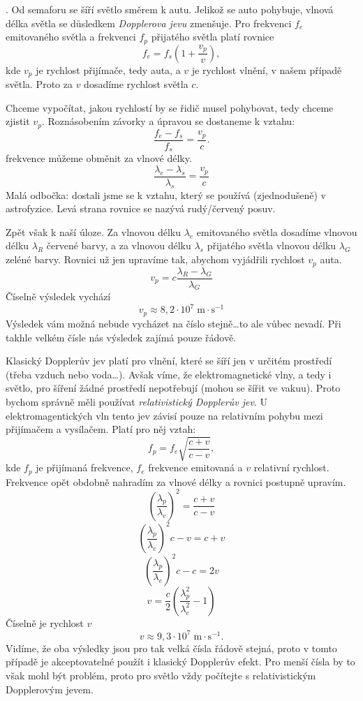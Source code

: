 \documentclass{../../../../style/mkimain}
\begin{document}
\noindent{}
.
\klein
Od semaforu se šíří světlo směrem k autu. Jelikož se auto pohybuje, vlnová délka světla se důsledkem \emph{Dopplerova jevu} zmenšuje.
Pro frekvenci $f_e$ emitovaného světla a frekvenci $f_p$ přijatého světla platí rovnice
$$f_e=f_s\left(1+\frac{v_p}{v}\right),$$
kde $v_p$ je rychlost přijímače, tedy auta, a $v$ je rychlost vlnění, v našem případě světla.
Proto za $v$ dosadíme rychlost světla $c$.

Chceme vypočítat, jakou rychlostí by se řidič musel pohybovat, tedy chceme zjistit $v_p$.
Roznásobením závorky a úpravou se dostaneme k vztahu:
$$\frac{f_e-f_s}{f_s}=\frac{v_p}{c}.$$
frekvence můžeme obměnit za vlnové délky. 
$$\frac{\lambda_e-\lambda_s}{\lambda_s}=\frac{v_p}{c}$$
Malá odbočka: dostali jsme se k vztahu, který se používá (zjednodušeně) v astrofyzice. Levá strana rovnice se nazývá rudý/červený posuv. 

Zpět však k naší úloze.
Za vlnovou délku $\lambda_e$ emitovaného světla dosadíme vlnovou délku $\lambda_R$ červené barvy, a za vlnovou délku $\lambda_s$ přijatého světla vlnovou délku $\lambda_G$ zeléné barvy. 
Rovnici už jen upravíme tak, abychom vyjádřili rychlost $v_p$ auta.
$${v_p}=c\frac{\lambda_R-\lambda_G}{\lambda_G}$$
Číselně výsledek vychází
$$v_p\approx8,2\cdot10^7\;\mathrm{m\cdot s^{-1}}$$
Výsledek vám možná nebude vycházet na číslo stejně\dots to ale vůbec nevadí. Při takhle velkém čísle nás výsledek zajímá pouze řádově.  

Klasický Dopplerův jev platí pro vlnění, které se šíří jen v určitém prostředí (třeba vzduch nebo voda\dots).
Avšak víme, že elektromagnetické vlny, a tedy i světlo, pro šíření žádné prostředí nepotřebují (mohou se šířit ve vakuu).
Proto bychom správně měli používat \textit{relativistický Dopplerův jev}.
U elektromagentických vln tento jev závisí pouze na relativním pohybu mezi přijímačem a vysílačem.
\newpage
\noindent
Platí pro něj vztah:
$$f_p=f_e\sqrt{\frac{c+v}{c-v}},$$
kde $f_p$ je přijímaná frekvence, $f_e$ frekvence emitovaná a $v$ relativní rychlost.
Frekvence opět obdobně nahradím za vlnové délky a rovnici postupně upravím.
$$\left(\frac{\lambda_p}{\lambda_e}\right)^2=\frac{c+v}{c-v}$$
$$\left(\frac{\lambda_p}{\lambda_e}\right)^2{c-v}={c+v}$$
$$\left(\frac{\lambda_p}{\lambda_e}\right)^2c-c=2v$$
$$v=\frac{c}{2}\left(\frac{\lambda_p^2}{\lambda_e^2}-1\right)$$
Číselně je rychlost $v$
$$v\approx9,3\cdot10^7\;\mathrm{m\cdot s^{-1}}.$$
Vidíme, že oba výsledky jsou pro tak velká čísla řádově stejná, proto v tomto případě je akceptovatelné použít i klasický Dopplerův efekt.
Pro menší čísla by to však mohl být problém, proto pro světlo vždy počítejte s relativistickým Dopplerovým jevem.
\end{document}

